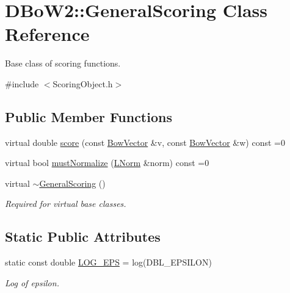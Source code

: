 \hypertarget{class_d_bo_w2_1_1_general_scoring}{}\section{D\+Bo\+W2\+:\+:General\+Scoring Class Reference}
\label{class_d_bo_w2_1_1_general_scoring}


Base class of scoring functions.  




{\ttfamily \#include $<$Scoring\+Object.\+h$>$}

\subsection*{Public Member Functions}
\begin{DoxyCompactItemize}
\item 
virtual double \mbox{\hyperlink{class_d_bo_w2_1_1_general_scoring_a43b3f5fedb19e6a19e17b9813efd17e8}{score}} (const \mbox{\hyperlink{class_d_bo_w2_1_1_bow_vector}{Bow\+Vector}} \&v, const \mbox{\hyperlink{class_d_bo_w2_1_1_bow_vector}{Bow\+Vector}} \&w) const =0
\item 
virtual bool \mbox{\hyperlink{class_d_bo_w2_1_1_general_scoring_ab0cadafd50b0f2f559f6325a6944f72f}{must\+Normalize}} (\mbox{\hyperlink{namespace_d_bo_w2_a53e9e0bcfc25c861815e413a7cf3fa51}{L\+Norm}} \&norm) const =0
\item 
virtual \mbox{\hyperlink{class_d_bo_w2_1_1_general_scoring_a1796812280a5188e06d8137baa977776}{$\sim$\+General\+Scoring}} ()
\begin{DoxyCompactList}\small\item\em Required for virtual base classes. \end{DoxyCompactList}\end{DoxyCompactItemize}
\subsection*{Static Public Attributes}
\begin{DoxyCompactItemize}
\item 
static const double \mbox{\hyperlink{class_d_bo_w2_1_1_general_scoring_af470bccf750689525622f216f07d6f3c}{L\+O\+G\+\_\+\+E\+PS}} = log(D\+B\+L\+\_\+\+E\+P\+S\+I\+L\+ON)
\begin{DoxyCompactList}\small\item\em Log of epsilon. \end{DoxyCompactList}\end{DoxyCompactItemize}


